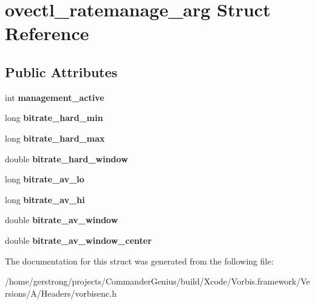\hypertarget{structovectl__ratemanage__arg}{
\section{ovectl\_\-ratemanage\_\-arg Struct Reference}
\label{structovectl__ratemanage__arg}
}
\subsection*{Public Attributes}
\begin{DoxyCompactItemize}
\item 
\hypertarget{structovectl__ratemanage__arg_ad792d1b89a5d07f0f0e90509df4bc606}{
int {\bfseries management\_\-active}}
\label{structovectl__ratemanage__arg_ad792d1b89a5d07f0f0e90509df4bc606}

\item 
\hypertarget{structovectl__ratemanage__arg_a449d3ea8d0645742af859dd17b41fbfb}{
long {\bfseries bitrate\_\-hard\_\-min}}
\label{structovectl__ratemanage__arg_a449d3ea8d0645742af859dd17b41fbfb}

\item 
\hypertarget{structovectl__ratemanage__arg_a3620024b5a9e4b4df6d20deb6c125c92}{
long {\bfseries bitrate\_\-hard\_\-max}}
\label{structovectl__ratemanage__arg_a3620024b5a9e4b4df6d20deb6c125c92}

\item 
\hypertarget{structovectl__ratemanage__arg_a68caf36fc02a52199705fa331d118446}{
double {\bfseries bitrate\_\-hard\_\-window}}
\label{structovectl__ratemanage__arg_a68caf36fc02a52199705fa331d118446}

\item 
\hypertarget{structovectl__ratemanage__arg_ac241670a3a608f114acaf8f26fe4e913}{
long {\bfseries bitrate\_\-av\_\-lo}}
\label{structovectl__ratemanage__arg_ac241670a3a608f114acaf8f26fe4e913}

\item 
\hypertarget{structovectl__ratemanage__arg_ac1e81b5a2e705022ca895f494718ded7}{
long {\bfseries bitrate\_\-av\_\-hi}}
\label{structovectl__ratemanage__arg_ac1e81b5a2e705022ca895f494718ded7}

\item 
\hypertarget{structovectl__ratemanage__arg_a1232e7296ae5e52f52039bed2560c505}{
double {\bfseries bitrate\_\-av\_\-window}}
\label{structovectl__ratemanage__arg_a1232e7296ae5e52f52039bed2560c505}

\item 
\hypertarget{structovectl__ratemanage__arg_aad317d50fb4d072e2c55f0a60d1a83b2}{
double {\bfseries bitrate\_\-av\_\-window\_\-center}}
\label{structovectl__ratemanage__arg_aad317d50fb4d072e2c55f0a60d1a83b2}

\end{DoxyCompactItemize}


The documentation for this struct was generated from the following file:\begin{DoxyCompactItemize}
\item 
/home/gerstrong/projects/CommanderGenius/build/Xcode/Vorbis.framework/Versions/A/Headers/vorbisenc.h\end{DoxyCompactItemize}
